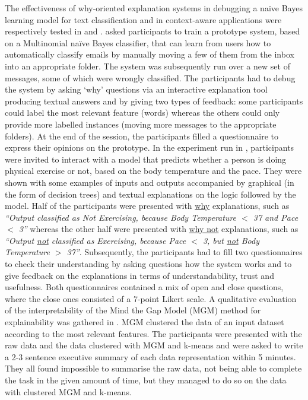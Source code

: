 \documentclass[final,1p,times]{elsarticle}
\begin{document}
The effectiveness of why-oriented explanation systems in debugging a na\"{i}ve Bayes learning model for text classification and in context-aware applications were respectively tested in \cite{kulesza2011oriented, kulesza2015principles} and \cite{lim2009assessing,lim2009and}. \cite{kulesza2011oriented, kulesza2015principles} asked participants to train a prototype system, based on a Multinomial na\"{i}ve Bayes classifier, that can learn from users how to automatically classify emails by manually moving a few of them from the inbox into an appropriate folder. The system was subsequently run over a new set of messages, some of which were wrongly classified. The participants had to debug the system by asking `why' questions via an interactive explanation tool producing textual answers and by giving two types of feedback: some participants could label the most relevant feature (words) whereas the others could only provide more labelled instances (moving more messages to the appropriate folders). At the end of the session, the participants filled a questionnaire to express their opinions on the prototype. 
In the experiment run in \cite{lim2009assessing,lim2009and}, participants were invited to interact with a model that predicts whether a person is doing physical exercise or not, based on the body temperature and the pace. They were shown with some examples of inputs and outputs accompanied by graphical (in the form of decision trees) and textual explanations on the logic followed by the model. Half of the participants were presented with \underline{why} explanations, such as \textit{``Output classified as Not Exercising, because Body Temperature $<$ 37 and Pace $<$ 3''} whereas the other half were presented with \underline{why not} explanations, such as \textit{``Output \underline{not} classified as Exercising, because Pace $<$ 3, but \underline{not} Body Temperature $>$ 37''}. Subsequently, the participants had to fill two questionnaires to check their understanding by asking questions how the system works and to give feedback on the explanations in terms of understandability, trust and usefulness. Both questionnaires contained a mix of open and close questions, where the close ones consisted of a 7-point Likert scale.
A qualitative evaluation of the interpretability of the Mind the Gap Model (MGM) method for explainability was gathered in \cite{kim2015mind}. MGM clustered the data of an input dataset according to the most relevant features. The participants were presented with the raw data and the data clustered with MGM and k-means and were asked to write a 2-3 sentence executive summary of each data representation within 5 minutes. They all found impossible to summarise the raw data, not being able to complete the task in the given amount of time, but they managed to do so on the data with clustered MGM and k-means. 
\end{document}

